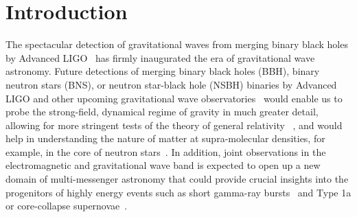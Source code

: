 \chapter{Introduction}

The spectacular detection of gravitational waves from merging binary black
holes by Advanced LIGO~\cite{Event_0, Event_2} has firmly inaugurated the era
of gravitational wave astronomy. Future detections of merging binary black
holes (BBH), binary neutron stars (BNS), or neutron star-black hole (NSBH)
binaries by Advanced LIGO and other upcoming  gravitational wave
observatories~\cite{KAGRA, Virgo, LIGO_india} would enable us to probe the
strong-field, dynamical regime of gravity in much greater detail, allowing for
more stringent tests of the theory of general relativity ~\cite{Berti2015}, and
would help in understanding the nature of matter at supra-molecular densities,
for example, in the core of neutron stars~\cite{Agathos,Chatziioannou}. In
addition, joint observations in the electromagnetic and gravitational wave band
is expected to open up a new domain of multi-messenger astronomy that could
provide crucial insights into the progenitors of highly energy events such as
short gamma-ray bursts~\cite{Arun2014} and Type 1a or core-collapse
supernovae~\cite{Falta2011,Ott2013}.


